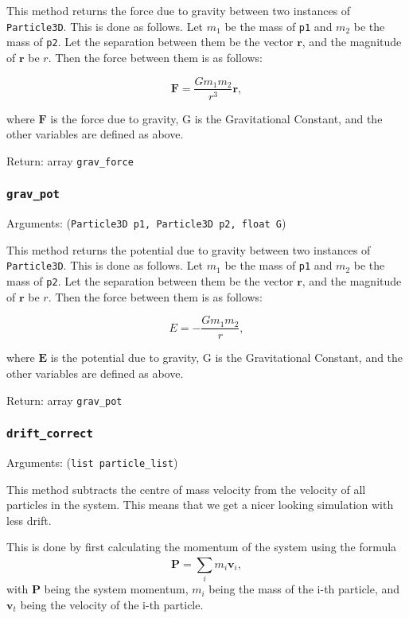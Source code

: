 \documentclass[a4paper, 11pt, british, left=1in, right=1in, top=0.3in, bottom=1in]{article}
\begin{document}
	This method returns the force due to gravity between two instances of \texttt{Particle3D}. This is done as follows. Let $m_1$ be the mass of \texttt{p1} and $m_2$ be the mass of \texttt{p2}. Let the separation between them be the vector $\textbf{r}$, and the magnitude of $\textbf{r}$ be $r$. Then the force between them is as follows:
	
	$$\textbf{F} = \frac{Gm_1m_2}{r^3}\textbf{r},$$
	
	where $\textbf{F}$ is the force due to gravity, G is the Gravitational Constant, and the other variables are defined as above. 
	
	Return: array \texttt{grav\_force}
	
	\subsubsection{\texttt{grav\_pot}}
	
	Arguments: (\texttt{Particle3D p1, Particle3D p2, float G})
	
	This method returns the potential due to gravity between two instances of \texttt{Particle3D}. This is done as follows. Let $m_1$ be the mass of \texttt{p1} and $m_2$ be the mass of \texttt{p2}. Let the separation between them be the vector $\textbf{r}$, and the magnitude of $\textbf{r}$ be $r$. Then the force between them is as follows:
	
	$$E = -\frac{Gm_1m_2}{r},$$
	
	where $\textbf{E}$ is the potential due to gravity, G is the Gravitational Constant, and the other variables are defined as above. 

	Return: array \texttt{grav\_pot}
	
	\subsubsection{\texttt{drift\_correct}}
	
	Arguments: (\texttt{list particle\_list})
	
	This method subtracts the centre of mass velocity from the velocity of all particles in the system. This means that we get a nicer looking simulation with less drift. 
	
	This is done by first calculating the momentum of the system using the formula $$\textbf{P} = \sum_{i}^{}m_i\textbf{v}_i, $$ with $\textbf{P}$ being the system momentum, $m_i$ being the mass of the i-th particle, and $\textbf{v}_t$ being the velocity of the i-th particle. 
	
\end{document}
